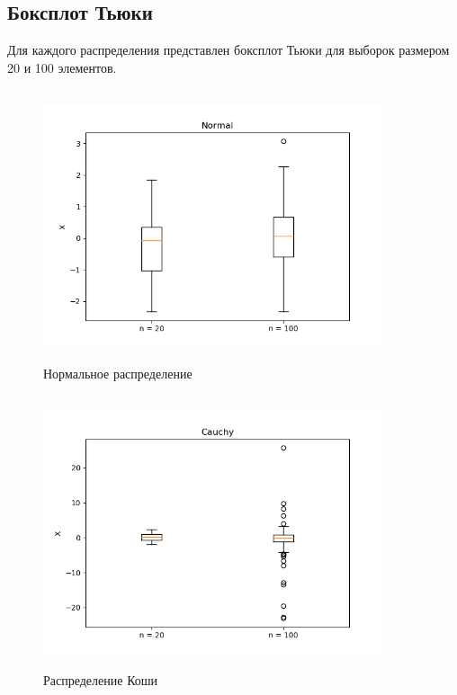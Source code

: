 \documentclass[../body.tex]{subfiles}
\begin{document}
\subsection{Боксплот Тьюки}
Для каждого распределения представлен боксплот Тьюки для выборок размером 20 и 100 элементов.
\begin{figure}[H]
	\centering
	\includegraphics[width = 10cm, height = 8cm]{img/Normal_boxplot.png}
	\caption{Нормальное распределение}
	\label{fig:normal_boxplot}
\end{figure}

\begin{figure}[H]
	\centering
	\includegraphics[width = 10cm, height = 8cm]{img/Cauchy_boxplot.png}
	\caption{Распределение Коши}
	\label{fig:cauchy_boxplot}
\end{figure}
\end{document}

